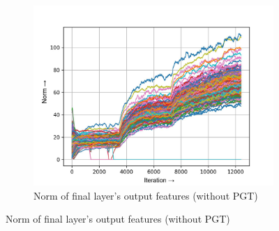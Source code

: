 \documentclass[times,sort&compress]{elsarticle}
\begin{document}
\begin{figure}[t]
\begin{subfigure}[t]{0.32\textwidth}
\includegraphics[width=\linewidth]{baseline-f-layer-22-1}
\caption{Norm of final layer's output features (without PGT)}
\end{subfigure}


\end{figure}
\end{document}
